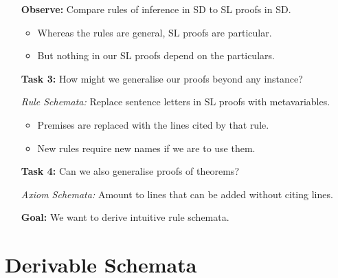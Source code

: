 \documentclass[a4paper, 11pt]{article} %
\begin{document}
\begin{multicols}{2}
\begin{enumerate}
  \item[\bf Observe:] Compare rules of inference in SD to SL proofs in SD.
    \begin{itemize}
      \item Whereas the rules are general, SL proofs are particular.
      \item But nothing in our SL proofs depend on the particulars.
    \end{itemize}
  \item[\bf Task 3:] How might we generalise our proofs beyond any instance?
  \item[\it Rule Schemata:] Replace sentence letters in SL proofs with metavariables.
    \begin{itemize}
      \item Premises are replaced with the lines cited by that rule.
      \item New rules require new names if we are to use them.
    \end{itemize}
  \item[\bf Task 4:] Can we also generalise proofs of theorems?
  \item[\it Axiom Schemata:] Amount to lines that can be added without citing lines. 
  \item[\bf Goal:] We want to derive intuitive rule schemata.
\end{enumerate}


\section*{Derivable Schemata}


\end{multicols}
\end{document}
